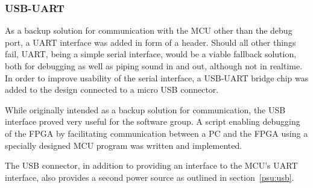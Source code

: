 
\subsubsection{USB-UART}

As a backup solution for communication with the MCU other than the debug
port, a UART interface was added in form of a header. Should all other things fail, UART, being a simple
serial interface, would be a viable fallback solution, both for debugging as well
as piping sound in and out, although not in realtime. In order to improve 
usability of the serial interface, a USB-UART bridge chip was added to the design
connected to a micro USB connector.

While originally intended as a backup solution for communication, the USB interface
proved very useful for the software group. A script enabling debugging
of the FPGA by facilitating communication between a PC and the FPGA using a specially
designed MCU program was written and implemented. 

The USB connector, in addition to providing an interface to the MCU's UART
interface, also provides a second power source as outlined in section~\ref{psu:usb}.